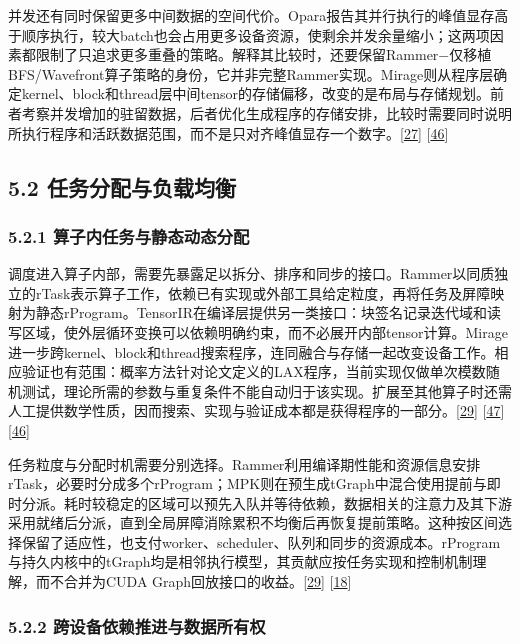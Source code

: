 \documentclass[
  11pt,
  UTF8]{ctexart}
\begin{document}
并发还有同时保留更多中间数据的空间代价。Opara报告其并行执行的峰值显存高于顺序执行，较大batch也会占用更多设备资源，使剩余并发余量缩小；这两项因素都限制了只追求更多重叠的策略。解释其比较时，还要保留Rammer−仅移植BFS/Wavefront算子策略的身份，它并非完整Rammer实现。Mirage则从程序层确定kernel、block和thread层中间tensor的存储偏移，改变的是布局与存储规划。前者考察并发增加的驻留数据，后者优化生成程序的存储安排，比较时需要同时说明所执行程序和活跃数据范围，而不是只对齐峰值显存一个数字。{[}\protect\hyperlink{ref-chen2025opara}{27}{]}
{[}\protect\hyperlink{ref-wu2025mirage}{46}{]}

\hypertarget{section-5-2}{%
\subsection{5.2 任务分配与负载均衡}\label{section-5-2}}

\hypertarget{section-5-2-1}{%
\subsubsection{5.2.1 算子内任务与静态动态分配}\label{section-5-2-1}}

调度进入算子内部，需要先暴露足以拆分、排序和同步的接口。Rammer以同质独立的rTask表示算子工作，依赖已有实现或外部工具给定粒度，再将任务及屏障映射为静态rProgram。TensorIR在编译层提供另一类接口：块签名记录迭代域和读写区域，使外层循环变换可以依赖明确约束，而不必展开内部tensor计算。Mirage进一步跨kernel、block和thread搜索程序，连同融合与存储一起改变设备工作。相应验证也有范围：概率方法针对论文定义的LAX程序，当前实现仅做单次模数随机测试，理论所需的参数与重复条件不能自动归于该实现。扩展至其他算子时还需人工提供数学性质，因而搜索、实现与验证成本都是获得程序的一部分。{[}\protect\hyperlink{ref-ma2020rammer}{29}{]}
{[}\protect\hyperlink{ref-feng2023tensorir}{47}{]}
{[}\protect\hyperlink{ref-wu2025mirage}{46}{]}

任务粒度与分配时机需要分别选择。Rammer利用编译期性能和资源信息安排rTask，必要时分成多个rProgram；MPK则在预生成tGraph中混合使用提前与即时分派。耗时较稳定的区域可以预先入队并等待依赖，数据相关的注意力及其下游采用就绪后分派，直到全局屏障消除累积不均衡后再恢复提前策略。这种按区间选择保留了适应性，也支付worker、scheduler、队列和同步的资源成本。rProgram与持久内核中的tGraph均是相邻执行模型，其贡献应按任务实现和控制机制理解，而不合并为CUDA
Graph回放接口的收益。{[}\protect\hyperlink{ref-ma2020rammer}{29}{]}
{[}\protect\hyperlink{ref-cheng2026mpk}{18}{]}

\hypertarget{section-5-2-2}{%
\subsubsection{5.2.2 跨设备依赖推进与数据所有权}\label{section-5-2-2}}
\end{document}
